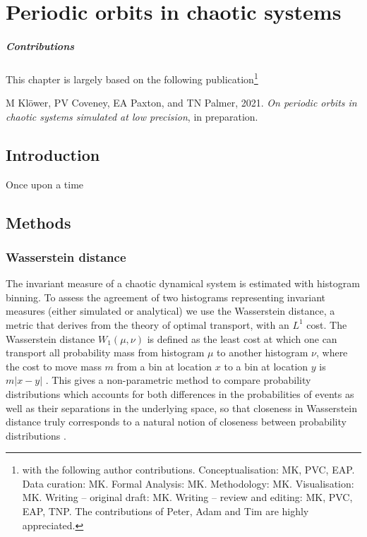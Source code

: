 \chapter{Periodic orbits in chaotic systems}
\label{chap:orbits}

\paragraph{Contributions} This chapter is largely based on the following publication\footnote{with the following author contributions.
Conceptualisation: MK, PVC, EAP. Data curation: MK. Formal Analysis: MK. Methodology: MK. Visualisation: MK. Writing – original draft:
MK. Writing – review and editing: MK, PVC, EAP, TNP. The contributions of Peter, Adam and Tim are highly appreciated.}

\vspace{\baselineskip}
\indent M Klöwer, PV Coveney, EA Paxton, and TN Palmer, 2021.
\emph{On periodic orbits in chaotic systems simulated at low precision}, in preparation.
\vspace{\baselineskip}



\section{Introduction}

Once upon a time

\section{Methods}
\subsection{Wasserstein distance}

The invariant measure of a chaotic dynamical system is estimated with histogram binning. To assess the agreement
of two histograms representing invariant measures (either simulated or analytical) we use the Wasserstein distance,
a metric that derives from the theory of optimal transport, with an $L^1$ cost. The Wasserstein distance $W_1(\mu,\nu)$
is defined as the least cost at which one can transport all probability mass from histogram $\mu$ to another histogram $\nu$,
where the cost to move mass $m$ from a bin at location $x$ to a bin at location $y$ is $m \vert x-y \vert$ \citep{Paxton2021,Villani2003}.
This gives a non-parametric method to compare probability distributions which accounts for both differences in the probabilities
of events as well as their separations in the underlying space, so that closeness in Wasserstein distance truly corresponds
to a natural notion of closeness between probability distributions \citep[Thm 7.12]{Villani2003}.

